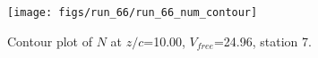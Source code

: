 \begin{figure}[H]
\centering
\texttt{[image: figs/run\_66/run\_66\_num\_contour]}
\caption{Contour plot of $N$ at $z/c$=10.00, $V_{free}$=24.96, station 7.}
\end{figure}


